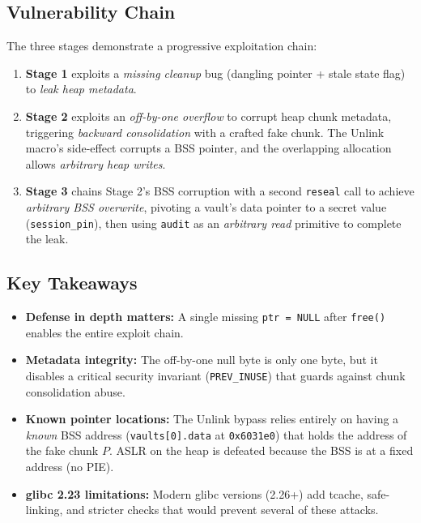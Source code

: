 \documentclass[12pt,a4paper]{article}
\begin{document}
\subsection{Vulnerability Chain}

The three stages demonstrate a progressive exploitation chain:

\begin{enumerate}
  \item \textbf{Stage 1} exploits a \textit{missing cleanup} bug (dangling
        pointer + stale state flag) to \textit{leak heap metadata}.
  \item \textbf{Stage 2} exploits an \textit{off-by-one overflow} to corrupt
        heap chunk metadata, triggering \textit{backward consolidation} with
        a crafted fake chunk. The Unlink macro's side-effect corrupts a BSS
        pointer, and the overlapping allocation allows \textit{arbitrary heap writes}.
  \item \textbf{Stage 3} chains Stage 2's BSS corruption with a second
        \texttt{reseal} call to achieve \textit{arbitrary BSS overwrite},
        pivoting a vault's data pointer to a secret value
        (\texttt{session\_pin}), then using \texttt{audit} as an \textit{arbitrary
        read} primitive to complete the leak.
\end{enumerate}

\subsection{Key Takeaways}

\begin{itemize}
  \item \textbf{Defense in depth matters:} A single missing \texttt{ptr = NULL}
        after \texttt{free()} enables the entire exploit chain.
  \item \textbf{Metadata integrity:} The off-by-one null byte is only one byte,
        but it disables a critical security invariant (\texttt{PREV\_INUSE})
        that guards against chunk consolidation abuse.
  \item \textbf{Known pointer locations:} The Unlink bypass relies entirely on
        having a \textit{known} BSS address (\texttt{vaults[0].data} at
        \texttt{0x6031e0}) that holds the address of the fake chunk $P$.
        ASLR on the heap is defeated because the BSS is at a fixed address
        (no PIE).
  \item \textbf{glibc 2.23 limitations:} Modern glibc versions (2.26+) add
        tcache, safe-linking, and stricter checks that would prevent several
        of these attacks.
\end{itemize}
\end{document}
